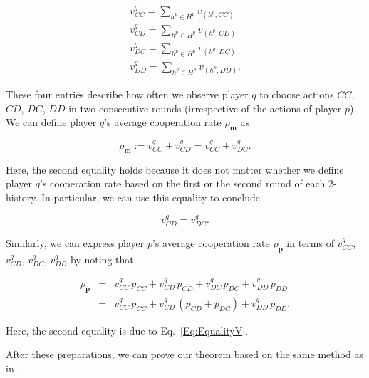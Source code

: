 \documentclass{article}
\theoremstyle{definition}
\begin{document}
\begin{equation}
\begin{array}{l}
\displaystyle v^q_{CC} = \sum_{h^p\in H^p} v_{(h^p,CC)}\\
\displaystyle v^q_{CD} = \sum_{h^p\in H^p} v_{(h^p,CD)}\\
\displaystyle v^q_{DC} = \sum_{h^p\in H^p} v_{(h^p,DC)}\\
\displaystyle v^q_{DD} = \sum_{h^p\in H^p} v_{(h^p,DD)}.
\end{array}
\end{equation}

These four entries describe how often we observe player $q$ to choose actions
$CC$, $CD$, $DC$, $DD$ in two consecutive rounds (irrespective of the actions of
player $p$). We can define player $q$'s average cooperation rate $\rho_\mathbf{m}$ as 

\begin{equation} \label{Eq:rhoq_n2}
\rho_\mathbf{m} := v^q_{CC} + v^q_{CD} = v^q_{CC} + v^q_{DC}.
\end{equation}

Here, the second equality holds because it does not matter whether we define
player $q$'s cooperation rate based on the first or the second round of each
2-history. In particular, we can use this equality to conclude

\begin{equation} \label{Eq:EqualityV}
v^q_{CD} = v^q_{DC}.
\end{equation}

Similarly, we can express player $p$'s average cooperation rate
$\rho_\mathbf{p}$ in terms of $v^q_{CC}$, $v^q_{CD}$, $v^q_{DC}$, $v^q_{DD}$ by
noting that

\begin{equation} \label{Eq:rhop_n2}
\begin{array}{lll}
\rho_\mathbf{p} &= &\displaystyle v^q_{CC}\, p_{CC} +  v^q_{CD}\,p_{CD} + v^q_{DC}\, p_{DC} + v^q_{DD}\, p_{DD}\\[0.2cm]
	& =  &v^q_{CC}\, p_{CC} +  v^q_{CD}\,(p_{CD}\!+\!p_{DC}) + v^q_{DD}\, p_{DD}.
\end{array}
\end{equation}

Here, the second equality is due to Eq.~\eqref{Eq:EqualityV}.

After these preparations, we can prove our theorem based on the same method as
in \citet{akin:EGADS:2016}.
 
\end{document}
